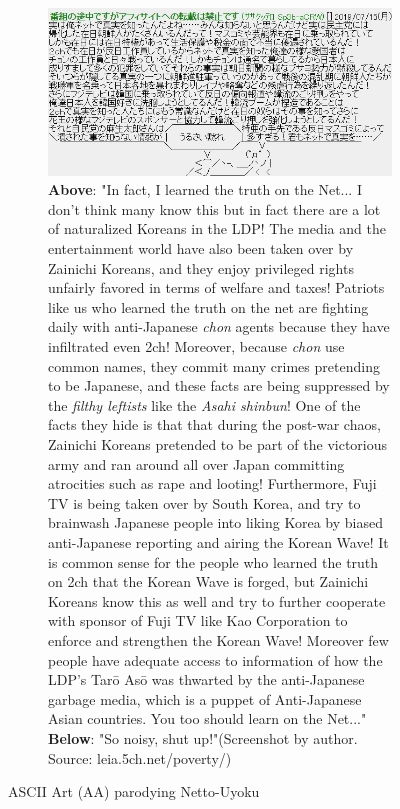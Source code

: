 \documentclass[10pt,british,A4paper,,openany]{memoir}
\begin{document}
\begin{figure}[!htb]
 \centering
 \begin{subfigure}[b]{0.95\textwidth}
  \includegraphics[width=\textwidth]{images/2channel/anti-aa.jpg}
  \caption*{\textbf{Above}: "In fact, I learned the truth on the Net... I don't think many know this but in fact there are a lot of naturalized Koreans in the LDP! The media and the entertainment world have also been taken over by Zainichi Koreans, and they enjoy privileged rights unfairly favored in terms of welfare and taxes! Patriots like us who learned the truth on the net are fighting daily with anti-Japanese \textit{chon} agents because they have infiltrated even 2ch! Moreover, because \textit{chon} use common names, they commit many crimes pretending to be Japanese, and these facts are being suppressed by the \textit{filthy leftists} like the \textit{Asahi shinbun}! One of the facts they hide is that that during the post-war chaos, Zainichi Koreans pretended to be part of the victorious army and ran around all over Japan committing atrocities such as rape and looting! Furthermore, Fuji TV is being taken over by South Korea, and try to brainwash Japanese people into liking Korea by biased anti-Japanese reporting and airing the Korean Wave! It is common sense for the people who learned the truth on 2ch that the Korean Wave is forged, but Zainichi Koreans know this as well and try to further cooperate with sponsor of Fuji TV like Kao Corporation to enforce and strengthen the Korean Wave! Moreover few people have adequate access to information of how the LDP's Tarō Asō was thwarted by the anti-Japanese garbage media, which is a puppet of Anti-Japanese Asian countries. You too should learn on the Net..." \textbf{Below}: "So noisy, shut up!"\newline (Screenshot by author. Source: leia.5ch.net/poverty/)}
  \label{fig:aajp}
 \end{subfigure}
 \caption{ASCII Art (AA) parodying Netto-Uyoku}\label{fig:aa}
\end{figure}
\end{document}
